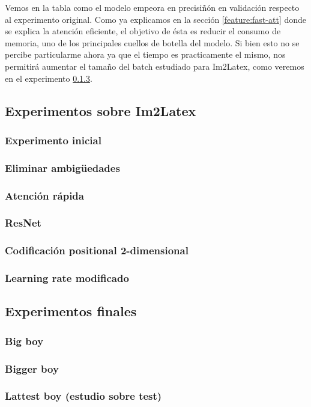 \documentclass[a4paper, 20pt, dvipsnames]{article}
\begin{document}
Vemos en la tabla como el modelo empeora en precisiñón en validación respecto al experimento original. Como ya explicamos en la sección \ref{feature:fast-att} donde se explica la atención eficiente, el objetivo de ésta es reducir el consumo de memoria, uno de los principales cuellos de botella del modelo. Si bien esto no se percibe particularme ahora ya que el tiempo es practicamente el mismo, nos permitirá aumentar el tamaño del batch estudiado para Im2Latex, como veremos en el experimento \ref{exp:3a}.

\subsection{Experimentos sobre Im2Latex}

\subsubsection{Experimento inicial}
\label{exp:1}


\subsubsection{Eliminar ambigüedades}
\label{exp:2}

\subsubsection{Atención rápida}
\label{exp:3a}

\subsubsection{ResNet}
\label{exp:3b}

\subsubsection{Codificación positional 2-dimensional}
\label{exp:3c}

\subsubsection{Learning rate modificado}

\subsection{Experimentos finales}

\subsubsection{Big boy}

\subsubsection{Bigger boy}

\subsubsection{Lattest boy (estudio sobre test)}








\printbibliography
\end{document}
